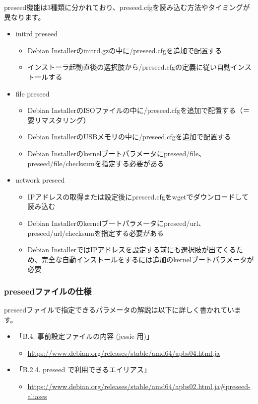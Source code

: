\documentclass[mingoth,a4paper]{jsarticle}
\begin{document}
preseed機能は3種類に分かれており、preseed.cfgを読み込む方法やタイミングが異なります。

\begin{itemize}
\item initrd preseed
  \begin{itemize}
  \item Debian Installerのinitrd.gzの中に/preseed.cfgを追加で配置する
  \item インストーラ起動直後の選択肢から/preseed.cfgの定義に従い自動インストールする
  \end{itemize}
\item file preseed
  \begin{itemize}
  \item Debian InstallerのISOファイルの中に/preseed.cfgを追加で配置する（＝要リマスタリング）
  \item Debian InstallerのUSBメモリの中に/preseed.cfgを追加で配置する
  \item Debian Installerのkernelブートパラメータにpreseed/file、preseed/file/checksumを指定する必要がある
  \end{itemize}
\item network preseed
  \begin{itemize}
  \item IPアドレスの取得または設定後にpreseed.cfgをwgetでダウンロードして読み込む
  \item Debian Installerのkernelブートパラメータにpreseed/url、preseed/url/checksumを指定する必要がある
  \item Debian InstallerではIPアドレスを設定する前にも選択肢が出てくるため、完全な自動インストールをするには追加のkernelブートパラメータが必要
  \end{itemize}
\end{itemize}


\subsubsection{preseedファイルの仕様}

preseedファイルで指定できるパラメータの解説は以下に詳しく書かれています。

\begin{itemize}
\item 「B.4. 事前設定ファイルの内容 (jessie 用)」
  \begin{itemize}
  \item \url{https://www.debian.org/releases/stable/amd64/apbs04.html.ja}
  \end{itemize}
  \item 「B.2.4. preseed で利用できるエイリアス」
  \begin{itemize}
  \item \url{https://www.debian.org/releases/stable/amd64/apbs02.html.ja#preseed-aliases}
  \end{itemize}
\end{itemize}
\end{document}
